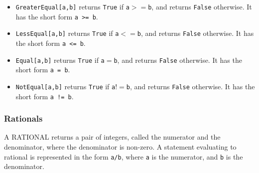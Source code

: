 \begin{itemize}
\item
\verb+GreaterEqual[a,b]+ returns \verb+True+ if \verb+a+$>=$\verb+b+, and
returns \verb+False+ otherwise.  It has the short form \verb+a >= b+.

\item
\verb+LessEqual[a,b]+ returns \verb+True+ if \verb+a+$<=$\verb+b+, and
returns \verb+False+ otherwise.  It has the short form \verb+a <= b+.

\item
\verb+Equal[a,b]+ returns \verb+True+ if \verb+a+$=$\verb+b+, and
returns \verb+False+ otherwise.  It has the short form \verb+a = b+.

\item
\verb+NotEqual[a,b]+ returns \verb+True+ if \verb+a+$!=$\verb+b+, and
returns \verb+False+ otherwise.  It has the short form \verb+a != b+.
\ed
\end{itemize}

\subsubsection{Rationals}

A RATIONAL returns a pair of integers, called the numerator and the
denominator, where the denominator is
non-zero.  A statement evaluating to rational is represented in the
form \verb+a/b+, where \verb+a+ is the numerator, and \verb+b+ is the
denominator.  

